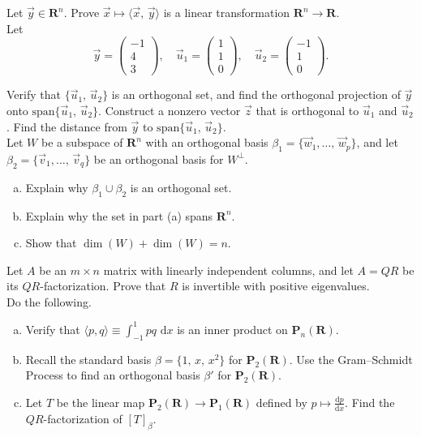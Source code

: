 \documentclass[a4paper,11pt]{article}
\newcommand{\R}{\mathbf{R}}
\newcommand{\PP}{\mathbf{P}}
\begin{document}
 Let $\vec y \in \R^n$. Prove $\vec x \mapsto
\langle \vec x,\,\vec y \rangle$ is a linear transformation $\R^n \rightarrow
\R$. \\

 Let
\[
  \vec y =
  \left(
    \begin{array}{r}
      -1\\4\\3
    \end{array}
  \right), \quad
  \vec u_1 =
  \left(
    \begin{array}{r}
      1\\1\\0
    \end{array}
  \right), \quad
  \vec u_2 =
  \left(
    \begin{array}{r}
      -1\\1\\0
    \end{array}
  \right).
\]

\noindent Verify that $\{\vec u_1,\,\vec u_2\}$ is an orthogonal set, and find
the orthogonal projection of $\vec y$ onto $\text{span}\{\vec u_1,\,\vec u_2\}$.
Construct a nonzero vector $\vec z$ that is orthogonal to $\vec u_1$ and $\vec
u_2$. Find the distance from $\vec y$ to $\text{span}\{\vec u_1,\,\vec u_2\}$.
\\

 Let $W$ be a subspace of $\R^n$ with an orthogonal
basis $\beta_1=\{\vec w_1, \dots,\,\vec w_p\}$, and let $\beta_2=\{\vec
v_1,\dots,\,\vec v_q\}$ be an orthogonal basis for $W^\perp$.
\begin{enumerate}[(a)]
\item Explain why $\beta_1 \cup \beta_2$ is an orthogonal set.
\item Explain why the set in part (a) spans $\R^n$.
\item Show that $\dim(W)+\dim(W)=n$. \\
\end{enumerate}

 Let $A$ be an $m \times n$ matrix with linearly
independent columns, and let $A=QR$ be its $QR$-factorization. Prove that $R$ is
invertible with positive eigenvalues. \\

 Do the following.
\begin{enumerate}[(a)]
\item Verify that $\langle p,q \rangle \equiv \int_{-1}^1pq\text{ d}x$ is an
  inner product on $\PP_n(\R)$.
\item Recall the standard basis $\beta=\{1,\,x,\,x^2\}$ for $\PP_2(\R)$. Use the
  Gram--Schmidt Process to find an orthogonal basis $\beta'$ for $\PP_2(\R)$.
\item Let $T$ be the linear map $\PP_2(\R) \rightarrow \PP_1(\R)$ defined by $p
  \mapsto \frac{\text{d}p}{\text{d}x}$. Find the $QR$-factorization of
  $[T]_\beta$.
\end{enumerate}
\end{document}
